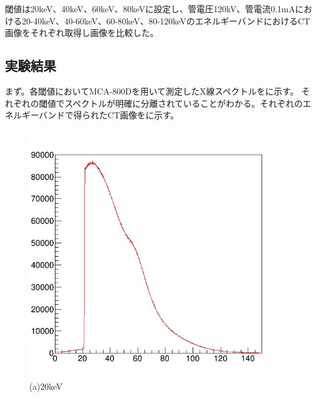 閾値は20keV、40keV、60keV、80keVに設定し、管電圧120kV、管電流0.1mAにおける20-40keV、40-60keV、60-80keV、80-120keVのエネルギーバンドにおけるCT画像をそれぞれ取得し画像を比較した。


\subsection{実験結果}
まず。各閾値においてMCA-800Dを用いて測定したX線スペクトルをに示す。
それぞれの閾値でスペクトルが明確に分離されていることがわかる。それぞれのエネルギーバンドで得られたCT画像をに示す。

\begin{figure}[H]
 \begin{minipage}{0.52\hsize}
  \begin{center}
   \includegraphics[bb=0.000000 0.000000 596.000000 574.000000,width=1.0\hsize]{image2/chapter5/120kV_0.1mA_20keV_100sec.png}
  \end{center}
\vspace{-1cm}
\caption*{(a)20keV}
 \end{minipage}
 \begin{minipage}{0.52\hsize}
  \begin{center}

\end{center}
\end{minipage}
\end{figure}
